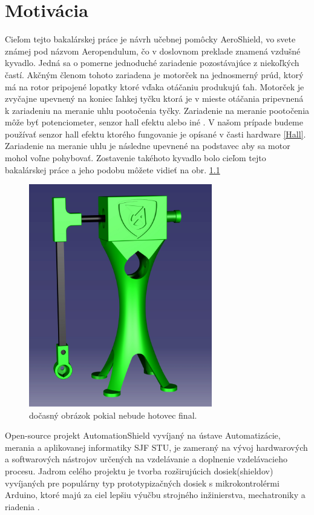 \chapter{Motivácia}

Cieľom tejto bakalárskej práce je návrh učebnej pomôcky AeroShield, vo svete známej pod názvom Aeropendulum, čo v doslovnom preklade znamená vzdušné kyvadlo. Jedná sa o pomerne jednoduché zariadenie pozostávajúce z niekoľkých častí. Akčným členom tohoto zariadena je  motorček na jednosmerný prúd, ktorý má na rotor pripojené lopatky ktoré vďaka otáčaniu produkujú ťah. Motorček je zvyčajne upevnený na koniec ľahkej tyčku ktorá je v mieste otáčania pripevnená k zariadeniu na meranie uhlu pootočenia tyčky. Zariadenie na meranie pootočenia môže byť potenciometer, senzor hall efektu alebo iné \cite{senzor}. V našom prípade budeme používať senzor hall efektu ktorého fungovanie je opísané v časti hardware \ref{Hall}. Zariadenie na meranie uhlu je následne upevnené na podstavec aby sa motor mohol voľne pohybovať. Zostavenie takéhoto kyvadlo bolo cieľom tejto bakalárskej práce a jeho podobu môžete vidieť na obr. \ref{OBRAZOK 1.1}

\begin{figure}[!tbh]
\centering
\includegraphics[width=80mm]{obr/pendulum.png}
\caption{dočasný obrázok pokial nebude hotovec final.}\label{OBRAZOK 1.1}
\end{figure}

Open-source projekt AutomationShield vyvíjaný na ústave Automatizácie, merania a aplikovanej informatiky SJF STU, je zameraný na vývoj hardwarových a softwarových nástrojov určených na vzdelávanie a doplnenie vzdelávacieho procesu. Jadrom celého projektu je tvorba rozširujúcich dosiek(shieldov) vyvíjaných pre populárny typ prototypizačných dosiek s mikrokontrolérmi Arduino, ktoré majú za ciel lepšiu výučbu strojného inžinierstva, mechatroniky a riadenia \cite{Auto}.

